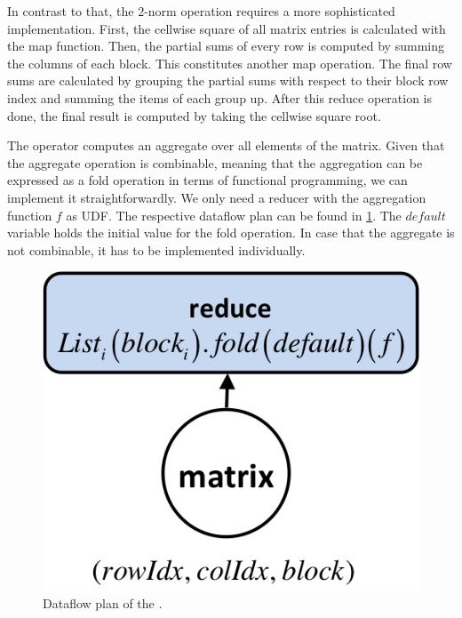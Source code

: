In contrast to that, the $2$-norm operation requires a more sophisticated implementation.
First, the cellwise square of all matrix entries is calculated with the map function.
Then, the partial sums of every row is computed by summing the columns of each block.
This constitutes another map operation.
The final row sums are calculated by grouping the partial sums with respect to their block row index and summing the items of each group up.
After this reduce operation is done, the final result is computed by taking the cellwise square root.

The  operator computes an aggregate over all elements of the matrix.
Given that the aggregate operation is combinable, meaning that the aggregation can be expressed as a fold operation in terms of functional programming, we can implement it straightforwardly.
We only need a reducer with the aggregation function $f$ as UDF.
The respective dataflow plan can be found in \cref{fig:planAggregateMatrixTransformation}.
The $default$ variable holds the initial value for the fold operation.
In case that the aggregate is not combinable, it has to be implemented individually.

\begin{figure}
	\centering
	\includegraphics[width=0.3\linewidth]{images/planAggregateMatrixTransformation.png}
	\caption{Dataflow plan of the .}
	\label{fig:planAggregateMatrixTransformation}
\end{figure}
